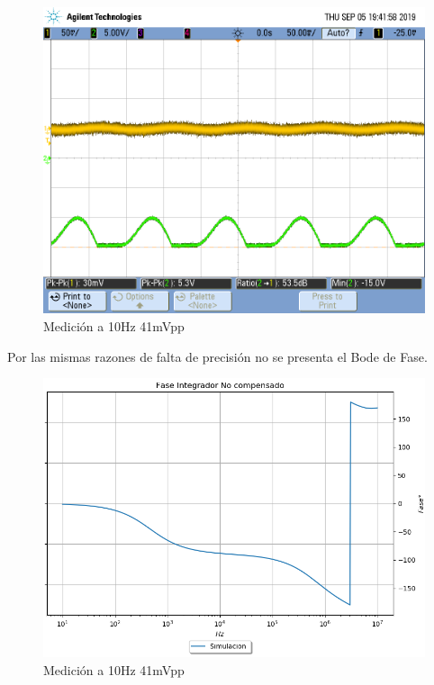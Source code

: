 \documentclass[a4paper]{article}
\begin{document}
\begin{figure}[H]
	\centering
	\includegraphics[width=\textwidth]{Ejercicio4/FOTOS-TP2-TC-EJ4/piso}
	\caption{Medición a 10Hz 41mVpp}
\end{figure}

Por las mismas razones de falta de precisión no se presenta el Bode de Fase.
\begin{figure}[H]
	\centering
	\includegraphics[width=\textwidth]{Ejercicio4/FASE-SIMULADO-INTEGRADOR-NO-COMPENSADO}
	\caption{Medición a 10Hz 41mVpp}
\end{figure}
\end{document}
